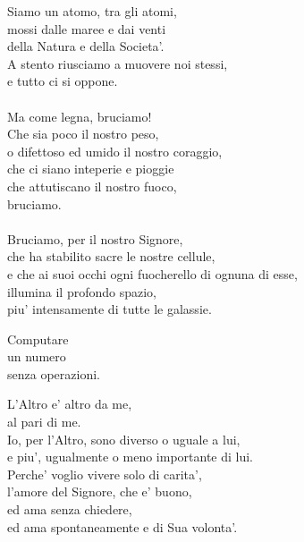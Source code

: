 \begin{haiku}
    Siamo un atomo, tra gli atomi,\\
    mossi dalle maree e dai venti \\
    della Natura e della Societa'.\\
    A stento riusciamo a muovere noi stessi,\\
    e tutto ci si oppone.\\
    \leavevmode\\
    Ma come legna, bruciamo!\\
    Che sia poco il nostro peso,\\
    o difettoso ed umido il nostro coraggio,\\
    che ci siano inteperie e pioggie\\
    che attutiscano il nostro fuoco,\\
    bruciamo.\\
    \leavevmode\\
    Bruciamo, per il nostro Signore,\\
    che ha stabilito sacre le nostre cellule,\\
    e che ai suoi occhi ogni fuocherello di ognuna di esse,\\
    illumina il profondo spazio,\\
    piu' intensamente di tutte le galassie.\\
\end{haiku}

\begin{haiku}
    Computare\\
    un numero\\
    senza operazioni.\\
\end{haiku}

\begin{haiku}
    L'Altro e' altro da me,\\
    al pari di me.\\
    Io, per l'Altro, sono diverso o uguale a lui,\\
    e piu', ugualmente o meno importante di lui.\\
    Perche' voglio vivere solo di carita',\\
    l'amore del Signore, che e' buono,\\
    ed ama senza chiedere,\\
    ed ama spontaneamente e di Sua volonta'.\\
\end{haiku}

